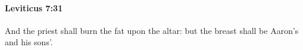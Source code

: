 
		\paragraph{Leviticus 7:31} %
			\label{LEVITICUS-7-31}

			And the priest shall burn the fat upon the altar: but the breast shall be Aaron’s and his sons’.



